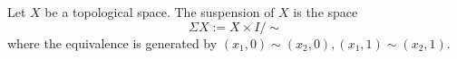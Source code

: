 
 
   Let $X$ be a topological space. The suspension of $X$ is the space 
   \[
    \Sigma X:=X\times I/\sim
    \]
    where the equivalence is generated by   $(x_1, 0)\sim(x_2, 0), (x_1, 1)\sim (x_2, 1)$.
    \label{def:suspension}
 